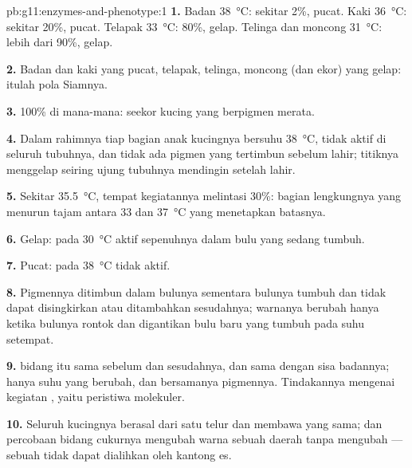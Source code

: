 \begin{solution}{pb:g11:enzymes-and-phenotype:1}
\textbf{1.} Badan \qty{38}{\celsius}: sekitar 2\%, pucat. Kaki
\qty{36}{\celsius}: sekitar 20\%, pucat. Telapak \qty{33}{\celsius}:
80\%, gelap. Telinga dan moncong \qty{31}{\celsius}: lebih dari 90\%, gelap.

\textbf{2.} Badan dan kaki yang pucat, telapak, telinga, moncong (dan
ekor) yang gelap: itulah pola Siamnya.

\textbf{3.} 100\% di mana-mana: seekor kucing yang berpigmen merata.

\textbf{4.} Dalam rahimnya tiap bagian anak kucingnya bersuhu
\qty{38}{\celsius},  tidak aktif di seluruh tubuhnya, dan tidak
ada pigmen yang tertimbun sebelum lahir; titiknya menggelap seiring
ujung tubuhnya mendingin setelah lahir.

\textbf{5.} Sekitar \qty{35.5}{\celsius}, tempat kegiatannya melintasi
30\%: bagian lengkungnya yang menurun tajam antara 33 dan
\qty{37}{\celsius} yang menetapkan batasnya.

\textbf{6.} Gelap: pada \qty{30}{\celsius}  aktif sepenuhnya
dalam bulu yang sedang tumbuh.

\textbf{7.} Pucat: pada \qty{38}{\celsius}  tidak aktif.

\textbf{8.} Pigmennya ditimbun dalam bulunya sementara bulunya tumbuh
dan tidak dapat disingkirkan atau ditambahkan sesudahnya; warnanya
berubah hanya ketika bulunya rontok dan digantikan bulu baru yang
tumbuh pada suhu setempat.

\textbf{9.}   bidang itu sama sebelum dan sesudahnya, dan
sama dengan sisa badannya; hanya suhu  yang berubah, dan
bersamanya pigmennya. Tindakannya mengenai kegiatan , yaitu
peristiwa molekuler.

\textbf{10.} Seluruh  kucingnya berasal dari satu  telur dan
membawa  yang sama; dan percobaan bidang cukurnya mengubah warna
sebuah daerah tanpa mengubah  --- sebuah  tidak dapat
dialihkan oleh kantong es.


\end{solution}
